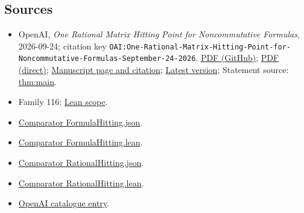 \documentclass[11pt]{article}
\begin{document}
\subsection{Sources}
\begin{itemize}
\item OpenAI, \emph{One Rational Matrix Hitting Point for Noncommutative Formulas}, 2026-09-24; citation key \texttt{OAI:One-Rational-Matrix-Hitting-Point-for-Noncommutative-Formulas-September-24-2026}. \href{https://github.com/openai/math/blob/adc7f1241b42e322a6451854ab7e4b4c146bf78a/preprints/One-Rational-Matrix-Hitting-Point-for-Noncommutative-Formulas-September-24-2026/One-Rational-Matrix-Hitting-Point-for-Noncommutative-Formulas-September-24-2026.pdf}{PDF (GitHub)}; \href{https://github.com/openai/math/raw/adc7f1241b42e322a6451854ab7e4b4c146bf78a/preprints/One-Rational-Matrix-Hitting-Point-for-Noncommutative-Formulas-September-24-2026/One-Rational-Matrix-Hitting-Point-for-Noncommutative-Formulas-September-24-2026.pdf}{PDF (direct)}; \href{https://github.com/openai/math/blob/adc7f1241b42e322a6451854ab7e4b4c146bf78a/preprints/One-Rational-Matrix-Hitting-Point-for-Noncommutative-Formulas-September-24-2026/README.md}{Manuscript page and citation}; \href{https://github.com/openai/math/blob/main/preprints/One-Rational-Matrix-Hitting-Point-for-Noncommutative-Formulas-September-24-2026/One-Rational-Matrix-Hitting-Point-for-Noncommutative-Formulas-September-24-2026.pdf}{Latest version}; Statement source: \href{https://github.com/openai/math/blob/adc7f1241b42e322a6451854ab7e4b4c146bf78a/preprints/One-Rational-Matrix-Hitting-Point-for-Noncommutative-Formulas-September-24-2026/build/introduction.tex\#L24}{thm:main}.
\item Family 116: \href{https://github.com/openai/math/blob/adc7f1241b42e322a6451854ab7e4b4c146bf78a/lean/docs/116.md}{Lean scope}.
\item \href{https://github.com/openai/math/blob/adc7f1241b42e322a6451854ab7e4b4c146bf78a/lean/ComparatorChallenges/FormulaHitting.json}{Comparator FormulaHitting.json}.
\item \href{https://github.com/openai/math/blob/adc7f1241b42e322a6451854ab7e4b4c146bf78a/lean/ComparatorChallenges/FormulaHitting.lean}{Comparator FormulaHitting.lean}.
\item \href{https://github.com/openai/math/blob/adc7f1241b42e322a6451854ab7e4b4c146bf78a/lean/ComparatorChallenges/RationalHitting.json}{Comparator RationalHitting.json}.
\item \href{https://github.com/openai/math/blob/adc7f1241b42e322a6451854ab7e4b4c146bf78a/lean/ComparatorChallenges/RationalHitting.lean}{Comparator RationalHitting.lean}.
\item \href{https://github.com/openai/math/blob/adc7f1241b42e322a6451854ab7e4b4c146bf78a/CONTENTS.md}{OpenAI catalogue entry}.
\end{itemize}
\end{document}
